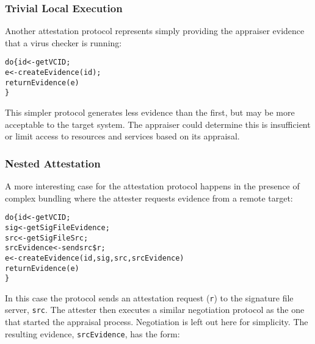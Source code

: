 \documentclass[10pt]{article}
\begin{document}
\subsubsection*{Trivial Local Execution}

Another attestation protocol represents simply providing the appraiser
evidence that a virus checker is running:

\begin{alltt}
  do \{ id <- getVCID;
       e <- createEvidence(id);
       returnEvidence(e)
  \}
\end{alltt}

This simpler protocol generates less evidence than the first, but may
be more acceptable to the target system.  The appraiser could
determine this is insufficient or limit access to resources and
services based on its appraisal.

\subsubsection*{Nested Attestation}

A more interesting case for the attestation protocol happens in the
presence of complex bundling where the attester requests evidence from
a remote target:

\begin{alltt}
  do \{ id <- getVCID;
       sig <- getSigFileEvidence;
       src <- getSigFileSrc;
       srcEvidence <- send src \$ r;
       e <- createEvidence(id,sig,src,srcEvidence)
       returnEvidence(e)
  \}
\end{alltt}

In this case the protocol sends an attestation request (\Verb+r+) to
the signature file server, \Verb+src+. The attester then executes a
similar negotiation protocol as the one that started the appraisal
process.  Negotiation is left out here for simplicity.  The resulting
evidence, \Verb+srcEvidence+, has the form:
\end{document}
